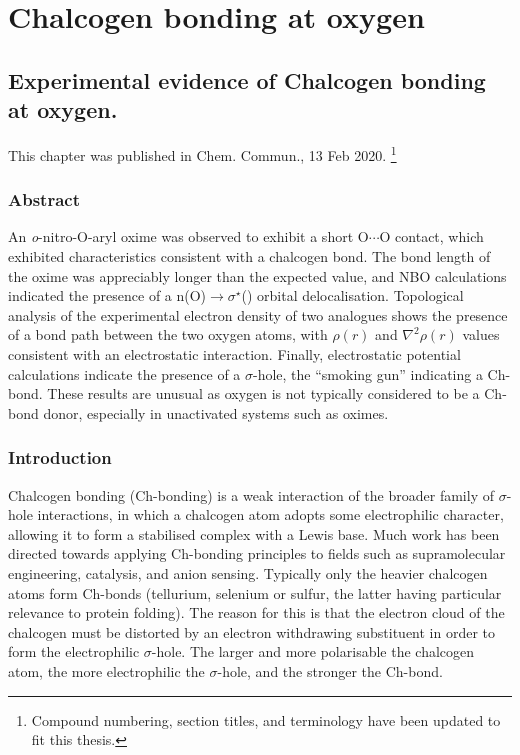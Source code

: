 \part{Chalcogen bonding at oxygen}
\begin{refsection}

\chapter{Experimental evidence of Chalcogen bonding at oxygen.}

This chapter was published in Chem. Commun., 13 Feb 2020\autocite{Fellowes2020}. \footnote{Compound numbering, section titles, and terminology have been updated to fit this thesis.}

\section{Abstract}
An \emph{o}-nitro-O-aryl oxime was observed to exhibit a short O$\cdots$O contact, which exhibited characteristics consistent with a chalcogen bond.
The  bond length of the oxime was appreciably longer than the expected value, and
NBO calculations indicated the presence of a n(O)$\rightarrow \sigma^{\star}$() orbital delocalisation.
Topological analysis of the experimental electron density of two analogues shows the presence of a bond path between the two oxygen atoms, with $\rho(r)$ and $\nabla^{2}\rho(r)$ values consistent with an electrostatic interaction.
Finally, electrostatic potential calculations indicate the presence of a $\sigma$-hole, the ``smoking gun'' indicating a Ch-bond.
These results are unusual as oxygen is not typically considered to be a Ch-bond donor, especially in unactivated systems such as oximes.

\section{Introduction}
Chalcogen bonding (Ch-bonding) is a weak interaction of the broader family of $\sigma$-hole interactions, in which a chalcogen atom adopts some electrophilic character, allowing it to form a stabilised complex with a Lewis base.
Much work has been directed towards applying Ch-bonding principles to fields such as supramolecular engineering, catalysis, and anion sensing.\autocite{Riwar2018,Mahmudov2017,Wonner2019,Ho2016,Kremer2016,Benz2017a}
Typically only the heavier chalcogen atoms form Ch-bonds (tellurium, selenium or sulfur, the latter having particular relevance to protein folding).\autocite{Iwaoka2012}
The reason for this is that the electron cloud of the chalcogen must be distorted by an electron withdrawing substituent in order to form the electrophilic $\sigma$-hole.
The larger and more polarisable the chalcogen atom, the more electrophilic the $\sigma$-hole, and the stronger the Ch-bond.\autocite{Murray2008}


\end{refsection}
